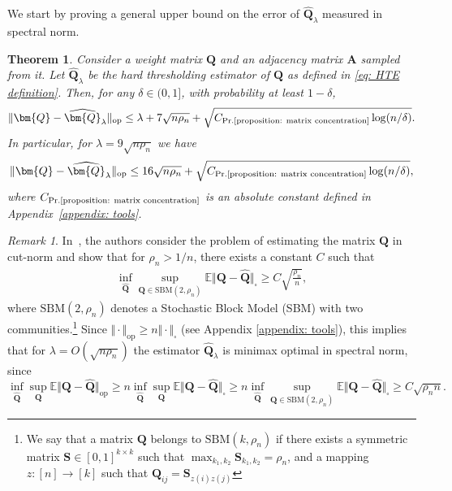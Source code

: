 \documentclass[11pt]{article}
\newcommand{\op}{\mathrm{op}}
\newcommand{\bA}{\bm{A}}
\newcommand{\bQ}{\bm{Q}}
\newcommand{\bQhat}{\widehat{\bm{Q}}}
\newcommand{\bbE}{\mathbb{E}}
\newcommand{\bS}{\bm{S}}
\newcommand{\constantBandeira}{C_{\text{Pr.\ref{proposition: matrix concentration}}}}
\newcommand{\<}{\langle}
\renewcommand{\>}{\rangle}
\theoremstyle{plain}
\newtheorem{theorem}{Theorem}
\theoremstyle{definition}
\theoremstyle{remark}
\newtheorem{remark}{Remark}
\begin{document}
We start by proving a general upper bound on the error of $\bQhat_{\lambda}$ measured in spectral norm.

\begin{theorem}
\label{theorem: UHTE performance}
    Consider a weight matrix $\bQ$ and an adjacency matrix $\bA$ sampled from it. Let $\bQhat_\lambda$ be the hard thresholding estimator of $\bQ$ as defined in \eqref{eq: HTE definition}. Then, for any $\delta \in (0,1]$, with probability at least $1 - \delta$, 
    \begin{align*}
        \Vert \bQ - \bQhat_\lambda \Vert_{\op} \le\lambda + 7 \sqrt{n \rho_n} + \sqrt{\constantBandeira \log (n/\delta)}.
    \end{align*}
    In particular, for $\lambda = 9 \sqrt{n \rho_n}$ we have
	\begin{equation}\label{eq:3}
		\Vert \bQ - \bQhat_\lambda \Vert_{\op} \le 16 \sqrt{n \rho_n} + \sqrt{\constantBandeira \log (n/\delta)},
	\end{equation}
	where $\constantBandeira$ is an absolute constant defined in Appendix~\ref{appendix: tools}.
\end{theorem}

\begin{remark}
In~\citep{klopp2019}, the authors  consider the problem of estimating the matrix $\bQ$ in  cut-norm and show that for $\rho_n > 1/n$, there exists a constant $C$ such that
\begin{align*}
	\inf_{\bQhat} \sup_{\bQ \in \text{SBM}(2, \rho_n)} \bbE \Vert \bQ - \bQhat \Vert_{\square} \ge C \sqrt{\frac{\rho_n}{n}},
\end{align*}
where $\text{SBM}(2, \rho_n)$ denotes a Stochastic Block Model (SBM) with two communities.\footnote{
We say that a matrix $\bQ$ belongs to $\text{SBM}(k, \rho_n)$ if there exists a symmetric matrix $\bS \in [0, 1]^{k \times k}$ such that $\max_{k_1, k_2} \bS_{k_1, k_2} = \rho_n$, and a mapping $z: [n] \to [k]$ such that $\bQ_{i j} = \bS_{z(i) z(j)}$}
Since $\Vert \cdot \Vert_{\op} \ge n \Vert \cdot \Vert_{\square}$ (see Appendix \ref{appendix: tools}), this implies that for $\lambda = O(\sqrt{n \rho_n})$ the estimator $\bQhat_\lambda$ is minimax optimal in spectral norm, since
$$\inf_{\bQhat} \sup_{\bQ } \bbE \Vert \bQ - \bQhat \Vert_{\op} \ge 
n \inf_{\bQhat} \sup_{\bQ } \bbE \Vert \bQ - \bQhat \Vert_{\square} \ge
n \inf_{\bQhat} \sup_{\bQ\in \text{SBM}(2, \rho_n) } \bbE \Vert \bQ - \bQhat \Vert_{\square}\ge C\sqrt{\rho_n n}.$$
\end{remark} 
\end{document}
